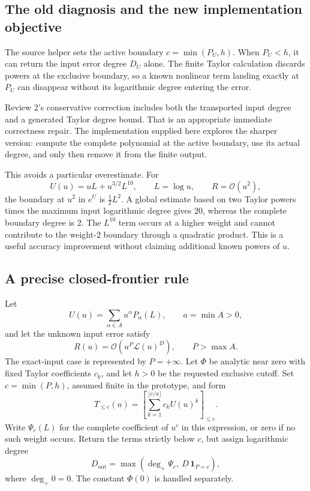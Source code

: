 \documentclass[11pt,letterpaper]{article}
\newcommand{\code}[1]{\texttt{\detokenize{#1}}}
\newcommand{\OO}{\mathcal{O}}
\newcommand{\LL}{\mathcal{L}}
\begin{document}
\subsection{The old diagnosis and the new implementation objective}
The source helper \code{unitSeriesPrecision} sets the active boundary $c=\min(P_U,h)$. When $P_U<h$, it can return the input error degree $D_U$ alone. The finite Taylor calculation discards powers at the exclusive boundary, so a known nonlinear term landing exactly at $P_U$ can disappear without its logarithmic degree entering the error.\cite{repo-core}

Review 2's conservative correction includes both the transported input degree and a generated Taylor degree bound. That is an appropriate immediate correctness repair. The implementation supplied here explores the sharper version: compute the complete polynomial at the active boundary, use its actual degree, and only then remove it from the finite output.

This avoids a particular overestimate. For
\begin{equation}
 U(u)=uL+u^{3/2}L^{10},\qquad L=\log u,
 \qquad R=\OO(u^2),
 \label{eq:sharpinput}
\end{equation}
the boundary at $u^2$ in $e^U$ is $\tfrac12L^2$. A global estimate based on two Taylor powers times the maximum input logarithmic degree gives $20$, whereas the complete boundary degree is $2$. The $L^{10}$ term occurs at a higher weight and cannot contribute to the weight-$2$ boundary through a quadratic product. This is a useful accuracy improvement without claiming additional known powers of $u$.

\subsection{A precise closed-frontier rule}
Let
\begin{equation}
 U(u)=\sum_{\alpha\in A}u^\alpha P_\alpha(L),
 \qquad a=\min A>0,
\end{equation}
and let the unknown input error satisfy
\begin{equation}
 R(u)=\OO\!\left(u^P\LL(u)^D\right),\qquad P>\max A.
\end{equation}
The exact-input case is represented by $P=+\infty$. Let $\Phi$ be analytic near zero with fixed Taylor coefficients $c_k$, and let $h>0$ be the requested exclusive cutoff. Set $c=\min(P,h)$, assumed finite in the prototype, and form
\begin{equation}
 T_{\le c}(u)=
 \left[\sum_{k=1}^{\lfloor c/a\rfloor}c_k U(u)^k\right]_{\le c}.
 \label{eq:closed}
\end{equation}
Write $\Psi_c(L)$ for the complete coefficient of $u^c$ in this expression, or zero if no such weight occurs. Return the terms strictly below $c$, but assign logarithmic degree
\begin{equation}
 D_{\mathrm{out}}=
 \max\left(\deg_+\Psi_c,\ D\,\mathbf{1}_{P=c}\right),
 \label{eq:degree}
\end{equation}
where $\deg_+0=0$. The constant $\Phi(0)$ is handled separately.
\end{document}
